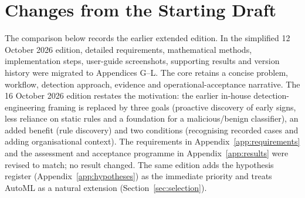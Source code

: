 \documentclass[11pt,a4paper]{article}
\begin{document}
\clearpage
\section{Changes from the Starting Draft}

The comparison below records the earlier extended edition. In the simplified 12 October 2026 edition, detailed requirements, mathematical methods, implementation steps, user-guide screenshots, supporting results and version history were migrated to Appendices G--L. The core retains a concise problem, workflow, detection approach, evidence and operational-acceptance narrative. The 16 October 2026 edition restates the motivation: the earlier in-house detection-engineering framing is replaced by three goals (proactive discovery of early signs, less reliance on static rules and a foundation for a malicious/benign classifier), an added benefit (rule discovery) and two conditions (recognising recorded cases and adding organisational context). The requirements in Appendix~\ref{app:requirements} and the assessment and acceptance programme in Appendix~\ref{app:results} were revised to match; no result changed. The same edition adds the hypothesis register (Appendix~\ref{app:hypotheses}) as the immediate priority and treats AutoML as a natural extension (Section~\ref{sec:selection}).
\label{app:changes}
\end{document}
